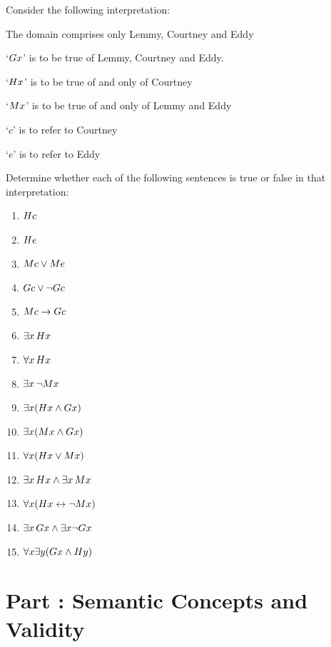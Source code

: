 \problempart
\label{pr.TorF2}
Consider the following interpretation:	
	\begin{ebullet}
		\item The domain comprises only Lemmy, Courtney and Eddy
		\item `$\mathord{G}x$' is to be true of Lemmy, Courtney and Eddy.
		\item `$\mathord{H}x$' is to be true of and only of Courtney
		\item `$\mathord{M}x$' is to be true of and only of Lemmy and Eddy
		\item `$c$' is to refer to Courtney
		\item `$e$' is to refer to Eddy
	\end{ebullet}
Determine whether each of the following sentences is true or false in that interpretation:
\begin{enumerate}
\item $\mathord{H}c $
\item $\mathord{H}e $
\item $\mathord{M}c  \vee \mathord{M}e$
\item $\mathord{G}c  \vee \neg \mathord{G}c$
\item $\mathord{M}c  \rightarrow \mathord{G}c$
\item $\exists x\, \mathord{H}x$
\item $\forall x\, \mathord{H}x$
\item $\exists x\, \neg \mathord{M}x$
\item $\exists x(\mathord{H}x \wedge \mathord{G}x)$
\item $\exists x(\mathord{M}x \wedge \mathord{G}x)$
\item $\forall x(\mathord{H}x \vee \mathord{M}x)$
\item $\exists x\, \mathord{H}x \wedge \exists x\, \mathord{M}x$
\item $\forall x(\mathord{H}x \leftrightarrow \neg \mathord{M}x)$
\item $\exists x\, \mathord{G}x \wedge \exists x \neg \mathord{G}x$
\item $\forall x\exists y(\mathord{G}x \wedge \mathord{H}y)$
\end{enumerate}
\setcounter{seccount}{1}
\chapter{Part \thechapcount: Semantic Concepts and Validity}
